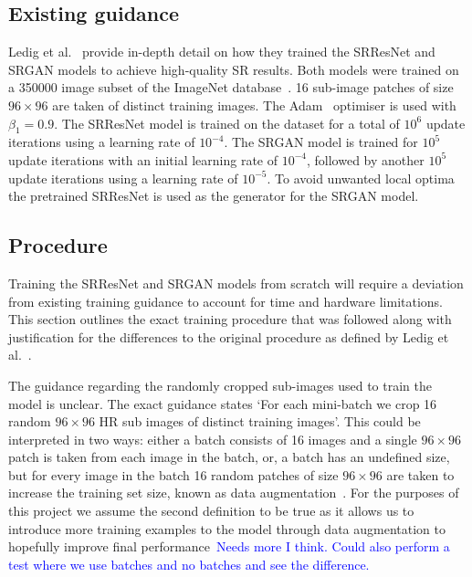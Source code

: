\subsection{Existing guidance}
Ledig et al.~\cite{srgan} provide in-depth detail on how they trained the SRResNet and SRGAN models to achieve high-quality SR results. Both models were trained on a 350000 image subset of the ImageNet database~\cite{ref}. 16 sub-image patches of size $96 \times 96$ are taken of distinct training images. The Adam~\cite{ref} optimiser is used with $\beta_1 = 0.9$. The SRResNet model is trained on the dataset for a total of $10^6$ update iterations using a learning rate of $10^{-4}$. The SRGAN model is trained for $10^5$ update iterations with an initial learning rate of $10^{-4}$, followed by another $10^5$ update iterations using a learning rate of $10^{-5}$. To avoid unwanted local optima the pretrained SRResNet is used as the generator for the SRGAN model.

\subsection{Procedure}\label{subsec:procedure}
Training the SRResNet and SRGAN models from scratch will require a deviation from existing training guidance to account for time and hardware limitations. This section outlines the exact training procedure that was followed along with justification for the differences to the original procedure as defined by Ledig et al.~\cite{srgan}.

The guidance regarding the randomly cropped sub-images used to train the model is unclear. The exact guidance states `For each mini-batch we crop 16 random $96 \times 96$ HR sub images of distinct training images'. This could be interpreted in two ways: either a batch consists of 16 images and a single $96 \times 96$ patch is taken from each image in the batch, or, a batch has an undefined size, but for every image in the batch 16 random patches of size $96 \times 96$ are taken to increase the training set size, known as data augmentation~\cite{ref}. For the purposes of this project we assume the second definition to be true as it allows us to introduce more training examples to the model through data augmentation to hopefully improve final performance\ \textcolor{blue}{Needs more I think. Could also perform a test where we use batches and no batches and see the difference.}

